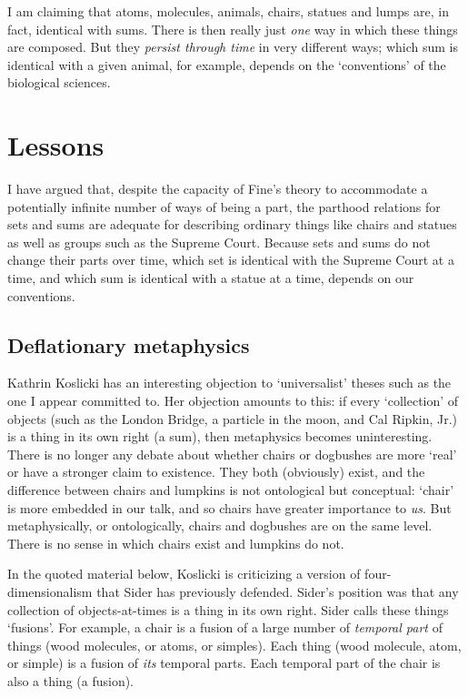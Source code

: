 \documentclass[11pt]{article}
\begin{document}
\begin{spacing}{1.5}
I am claiming that atoms, molecules, animals, chairs, statues and
lumps are, in fact, identical with sums.  There is then really just
{\em one} way in which these things are composed.  But they {\em
  persist through time} in very different ways; which sum is identical
with a given animal, for example, depends on the `conventions' of the
biological sciences.


\section{Lessons}
\label{lessons-p}
I have argued that, despite the capacity of Fine's theory to
accommodate a potentially infinite number of ways of being a part, the
parthood relations for sets and sums are adequate for describing
ordinary things like chairs and statues as well as groups such as the
Supreme Court.  Because sets and sums do not change their parts over
time, which set is identical with the Supreme Court at a time, and
which sum is identical with a statue at a time, depends on our
conventions.

\subsection{Deflationary metaphysics}
\label{deflate}
Kathrin Koslicki has an interesting objection to `universalist' theses
such as the one I appear committed to.  Her objection amounts to this:
if every `collection' of objects (such as the London Bridge, a
particle in the moon, and Cal Ripkin, Jr.) is a thing in its own right
(a sum), then metaphysics becomes uninteresting.  There is no longer
any debate about whether chairs or dogbushes are more `real' or have a
stronger claim to existence.  They both (obviously) exist, and the
difference between chairs and lumpkins is not ontological but
conceptual: `chair' is more embedded in our talk, and so chairs have
greater importance to {\em us}.  But metaphysically, or ontologically,
chairs and dogbushes are on the same level.  There is no sense in
which chairs exist and lumpkins do not.

In the quoted material below, Koslicki is criticizing a version of
four-dimensionalism that Sider has previously defended.  Sider's
position was that any collection of objects-at-times is a thing in its
own right.  Sider calls these things `fusions'.  For example, a chair
is a fusion of a large number of {\em temporal part} of things (wood
molecules, or atoms, or simples).  Each thing (wood molecule, atom, or
simple) is a fusion of {\em its} temporal parts.  Each temporal part
of the chair is also a thing (a fusion).


\end{spacing}
\end{document}
